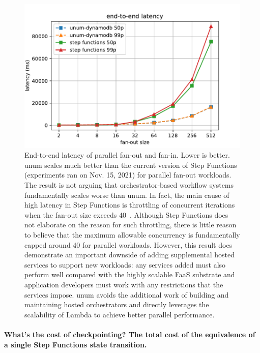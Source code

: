\begin{figure}[t!]
    \centering
    \includegraphics[width=\columnwidth]{figures/MapMicroLatency.pdf}
    \caption{End-to-end latency of parallel fan-out and fan-in. Lower is
    better. unum scales much better than the current version of Step Functions
    (experiments ran on Nov. 15, 2021) for parallel fan-out workloads. The
    result is not arguing that orchestrator-based workflow systems
    fundamentally scales worse than unum. In fact, the main cause of high
    latency in Step Functions is throttling of concurrent iterations when the
    fan-out size exceeds 40~\cite{aws-step-functions-map-state}. Although Step
    Functions does not elaborate on the reason for such throttling, there is
    little reason to believe that the maximum allowable concurrency is
    fundamentally capped around 40 for parallel workloads. However, this
    result does demonstrate an important downside of adding supplemental
    hosted services to support new workloads: any services added must also
    perform well compared with the highly scalable FaaS substrate and
    application developers must work with any restrictions that the services
    impose. unum avoids the additional work of building and maintaining hosted
    orchestrators and directly leverages the scalability of Lambda to achieve
    better parallel performance.}
    \label{fig:mapmicrolatency}
\end{figure}

\paragraph{What's the cost of checkpointing? The total cost of the equivalence
of a single Step Functions state transition.}




